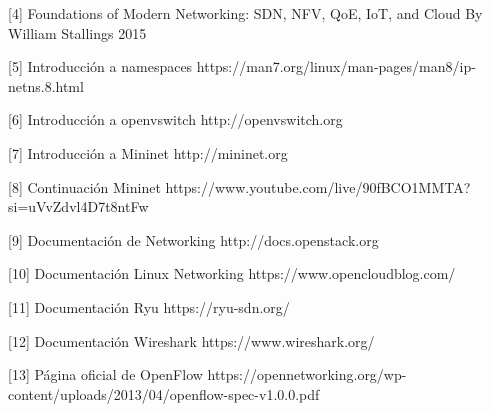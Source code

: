 \documentclass[a4paper, 12pt]{book}
\begin{document}
	[4]  Foundations of Modern Networking: SDN, NFV, QoE, IoT, and Cloud By William Stallings 2015
	
	[5]  Introducción a namespaces https://man7.org/linux/man-pages/man8/ip-netns.8.html
	
	[6]  Introducción a openvswitch http://openvswitch.org
	
	[7]  Introducción a Mininet http://mininet.org
	
	[8]  Continuación Mininet https://www.youtube.com/live/90fBCO1MMTA?si=uVvZdvl4D7t8ntFw
	
	[9]  Documentación de Networking http://docs.openstack.org
	
	[10] Documentación Linux Networking https://www.opencloudblog.com/
	
	[11] Documentación Ryu https://ryu-sdn.org/
	
	[12] Documentación Wireshark https://www.wireshark.org/
	
	[13] Página oficial de OpenFlow https://opennetworking.org/wp-content/uploads/2013/04/openflow-spec-v1.0.0.pdf
	
 	
	
\end{document}
